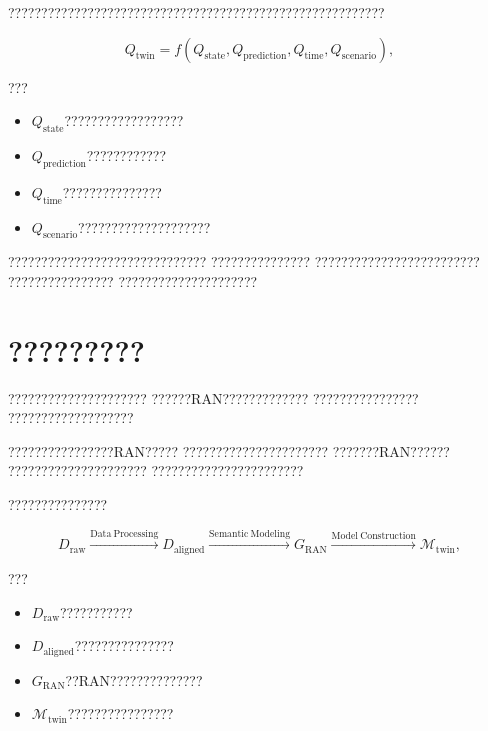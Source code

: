 ?????????????????????????????????????????????????????????

\begin{equation}
Q_{\mathrm{twin}}
=
f
\left(
Q_{\mathrm{state}},
Q_{\mathrm{prediction}},
Q_{\mathrm{time}},
Q_{\mathrm{scenario}}
\right),
\label{eq:twin_quality_dimensions_overview}
\end{equation}

???

\begin{itemize}
    \item $Q_{\mathrm{state}}$??????????????????
    \item $Q_{\mathrm{prediction}}$????????????
    \item $Q_{\mathrm{time}}$???????????????
    \item $Q_{\mathrm{scenario}}$????????????????????
\end{itemize}

??????????????????????????????
???????????????
?????????????????????????
????????????????
?????????????????????

\section{?????????}
\label{sec:high_fidelity_twin_modeling}

?????????????????????
??????RAN?????????????
????????????????
???????????????????

????????????????RAN?????
??????????????????????
???????RAN??????
?????????????????????
???????????????????????

???????????????

\begin{equation}
D_{\mathrm{raw}}
\xrightarrow{\mathrm{Data\ Processing}}
D_{\mathrm{aligned}}
\xrightarrow{\mathrm{Semantic\ Modeling}}
G_{\mathrm{RAN}}
\xrightarrow{\mathrm{Model\ Construction}}
\mathcal{M}_{\mathrm{twin}},
\label{eq:twin_modeling_process}
\end{equation}

???

\begin{itemize}
    \item $D_{\mathrm{raw}}$???????????
    \item $D_{\mathrm{aligned}}$???????????????
    \item $G_{\mathrm{RAN}}$??RAN??????????????
    \item $\mathcal{M}_{\mathrm{twin}}$????????????????
\end{itemize}


